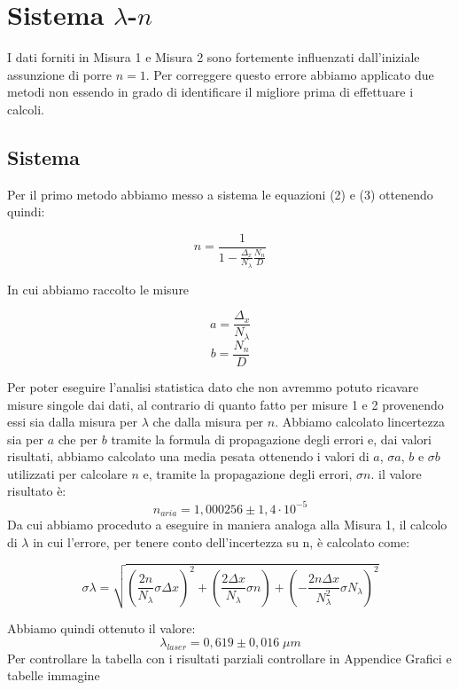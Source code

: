 \documentclass{article}
\begin{document}
\section{Sistema $\lambda$-$n$}
I dati forniti in Misura 1 e Misura 2 sono fortemente influenzati dall'iniziale assunzione di porre $n = 1$. Per correggere questo errore abbiamo applicato due metodi non essendo in grado di identificare il migliore prima di effettuare i calcoli. 



\subsection{Sistema}
Per il primo metodo abbiamo messo a sistema le equazioni (2) e (3) ottenendo quindi:

\begin{equation} 
n= \frac{1}{1 - \frac{\Delta_x}{N_\lambda} \frac{N_n}{D}} 
\end{equation}

In cui abbiamo raccolto le misure

\[ a = \frac{\Delta_x}{N_\lambda} \]
\[ b = \frac{N_n}{D} \]

Per poter eseguire l'analisi statistica dato che non avremmo potuto ricavare misure singole dai dati, al contrario di quanto fatto per misure 1 e 2 provenendo essi sia dalla misura per $\lambda$ che dalla misura per $n$. Abbiamo calcolato lincertezza sia per $a$ che per $b$ tramite la formula di propagazione degli errori e, dai valori risultati, abbiamo calcolato una media pesata ottenendo i valori di $a$, $\sigma a$, $b$ e $\sigma b$ utilizzati per calcolare $n$ e, tramite la propagazione degli errori, $\sigma n$. il valore risultato è:
\[ n_{aria} = 1,000256 \pm 1,4 \cdot 10^{-5} \]
Da cui abbiamo proceduto a eseguire in maniera analoga alla Misura 1, il calcolo di $\lambda$ in cui l'errore, per tenere conto dell'incertezza su n, è calcolato come:

\begin{equation} 
\sigma\lambda= \sqrt{(\frac{2 n}{N_\lambda} \sigma\Delta x)^2 + (\frac{2 \Delta x}{N_\lambda} \sigma n) + ({-} \frac{2 n \Delta x}{N_\lambda^2} \sigma{N_\lambda})^2} 
\end{equation}

Abbiamo quindi ottenuto il valore:
\[ \lambda_{laser} = 0,619 \pm 0,016 \; \mu m \]
Per controllare la tabella con i risultati parziali controllare in Appendice Grafici e tabelle immagine %
\end{document}
